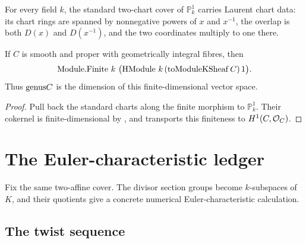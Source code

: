 \begin{theorem}
  \label{thm:adelic_P1_laurent_chart_data}
  \leanok
  For every field \(k\), the standard two-chart cover of
  \(\mathbb P^1_k\) carries Laurent chart data: its chart rings are
  spanned by nonnegative powers of \(x\) and \(x^{-1}\), the overlap is
  both \(D(x)\) and \(D(x^{-1})\), and the two coordinates multiply to
  one there.
\end{theorem}

\begin{theorem}
  \label{thm:adelic_module_finite_genus}
  \leanok
  If \(C\) is smooth and proper with geometrically integral fibres, then
  \[
    \mathrm{Module}.\mathrm{Finite}\ k\ \bigl(\operatorname{HModule}\, k\, (\operatorname{toModuleKSheaf} C)\, 1\bigr).
  \]
  Thus \(\mathrm{genus} C\) is the dimension of this finite-dimensional vector
  space.
\end{theorem}
\begin{proof}
  \leanok
  Pull back the standard charts along the finite morphism to
  \(\mathbb P^1_k\).  Their cokernel is finite-dimensional by
  , and
   transports this
  finiteness to \(H^1(C,\mathcal{O}_{C})\).
\end{proof}

\section{The Euler-characteristic ledger}
\label{sec:RiemannRoch_Adelic_chi}

Fix the same two-affine cover.  The divisor section groups become
\(k\)-subspaces of \(K\), and their quotients give a concrete numerical
Euler-characteristic calculation.

\subsection{The twist sequence}

